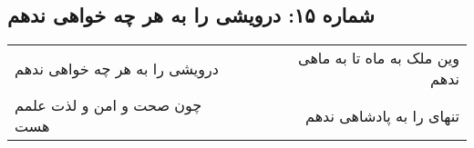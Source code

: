 \begin{center}
\section*{شماره ۱۵: درویشی را به هر چه خواهی ندهم}
\label{sec:015}
\begin{longtable}{l p{0.5cm} r}
درویشی را به هر چه خواهی ندهم
&&
وین ملک به ماه تا به ماهی ندهم
\\
چون صحت و امن و لذت علمم هست
&&
تنهای را به پادشاهی ندهم
\\
\end{longtable}
\end{center}

